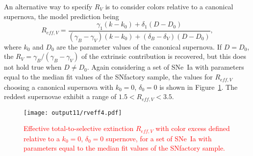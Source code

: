 \documentclass{aastex61}   	%
\begin{document}
An alternative way to specify $R_V$ is to consider colors relative to a canonical supernova,
 the model prediction being
\begin{equation}
R_{eff, V} = \frac{\gamma_1  (k-k_0) + \delta_1 (D-D_0) }{(\gamma_B-\gamma_V) (k-k_0) + (\delta_B-\delta_V) (D-D_0) },
\end{equation}
where $k_0$ and $D_0$ are the parameter values of the canonical supernova.
If $D = D_0$, the $R_V = \gamma_B/(\gamma_B-\gamma_V)$ of the extrinsic contribution is recovered, but this does not hold true
when $D \ne D_0$.  Again considering a set of SNe~Ia  with parameters equal to the median fit values of the SNfactory sample,
the values for $R_{eff,V}$ choosing a canonical supernova with $k_0=0$, $\delta_0=0$  is shown in Figure~\ref{rv4:fig}.
The reddest supernovae exhibit a range of $1.5< R_{eff,V}<3.5$. 

\begin{figure}[htbp] %
   \centering
   \texttt{[image: output11/rveff4.pdf]}
      \caption{\textcolor{red}{Effective total-to-selective extinction $R_{eff, V}$
      with color excess defined relative to  a
      $k_0=0$, $\delta_0=0$ supernove,  for  a set of SNe~Ia  with parameters equal to the median fit values of the SNfactory sample.}
   \label{rv4:fig}}
\end{figure}


\color{black}

%
\end{document}
